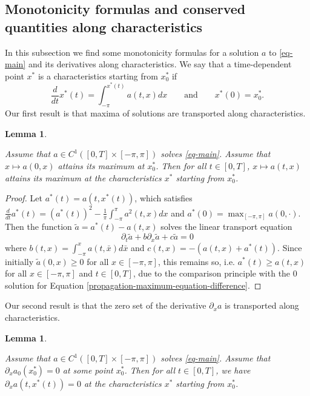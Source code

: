 \documentclass[12pt]{amsart}
\numberwithin{equation}{section}
\numberwithin{equation}{section}
\newtheorem{lem}[thm]{Lemma}
\begin{document}
\subsection{Monotonicity formulas and conserved quantities along characteristics} \label{sec:monotonicity-characteristics}

In this subsection we find some monotonicity formulas for a solution $a$ to \eqref{eq-main} and its derivatives along characteristics. We say that a time-dependent point $x^*$ is a characteristics starting from $x^*_0$ if 
$$
\frac{d}{dt} x^*(t)=\int_{-\pi}^{x^*(t)} a(t,x)dx \qquad \mbox{and}\qquad x^*(0)=x^*_0.
$$
Our first result is that maxima of solutions are transported along characteristics.


\begin{lem} \label{lem:propagation-maximum}

Assume that $a\in C^1([0,T]\times[-\pi,\pi])$ solves \eqref{eq-main}. Assume that $x\mapsto a(0,x)$ attains its maximum at $x_0^*$. Then for all $t\in [0,T]$, $x\mapsto a(t,x)$ attains its maximum at the characteristics $x^*$ starting from $x^*_0$.

\end{lem}


\begin{proof}
Let $a^*(t)=a(t,x^*(t))$, which satisfies $\frac{d}{dt} a^*(t)=(a^*(t))^2-\frac{1}{\pi}\int_{-\pi}^\pi a^2(t,x)dx$ and $a^*(0)=\max_{[-\pi,\pi]}a(0,\cdot)$. Then the function $\tilde a=a^*(t)-a(t,x)$ solves the linear transport equation
\begin{equation} \label{propagation-maximum-equation-difference}
\partial_t \tilde a+b\partial_x \tilde a+c\tilde a =0
\end{equation}
where $b(t,x)=\int_{-\pi}^x a(t,\bar x)d\bar x$ and $c(t,x)=-(a(t,x)+a^*(t))$. Since initially $\tilde a(0,x)\geq 0$ for all $x\in[-\pi,\pi]$, this remains so, i.e. $ a^*(t)\geq a(t,x)$ for all $x\in[-\pi,\pi]$ and $t\in [0,T]$, due to the comparison principle with the $0$ solution for Equation \eqref{propagation-maximum-equation-difference}.
\end{proof}


Our second result is that the zero set of the derivative $\partial_x a$ is transported along characteristics.


\begin{lem} \label{lem:propagation-zero-set-derivatives}

Assume that $a\in C^1([0,T]\times[-\pi,\pi])$ solves \eqref{eq-main}. Assume that $\partial_x a_0(x^*_0)=0$ at some point $x_0^*$. Then for all $t\in [0,T]$, we have $\partial_x a(t,x^*(t))=0$ at the characteristics $x^*$ starting from $x^*_0$.

\end{lem}
\end{document}
